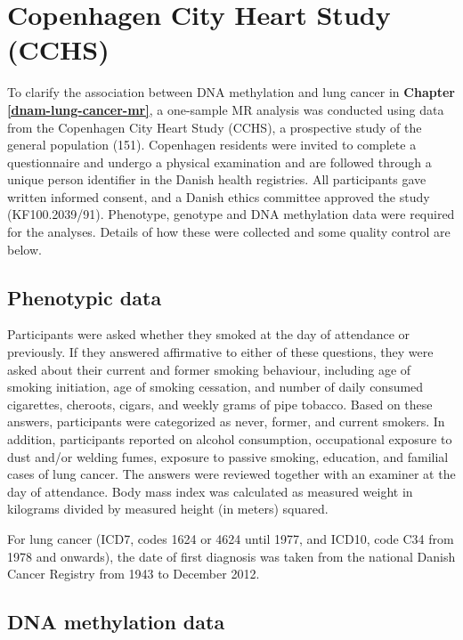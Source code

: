 \documentclass[11pt,twoside]{bristolthesis}
\begin{document}
\hypertarget{cchs-02}{%
\section{Copenhagen City Heart Study (CCHS)}\label{cchs-02}}

To clarify the association between DNA methylation and lung cancer in \textbf{Chapter \ref{dnam-lung-cancer-mr}}, a one-sample MR analysis was conducted using data from the Copenhagen City Heart Study (CCHS), a prospective study of the general population (151). Copenhagen residents were invited to complete a questionnaire and undergo a physical examination and are followed through a unique person identifier in the Danish health registries. All participants gave written informed consent, and a Danish ethics committee approved the study (KF100.2039/91). Phenotype, genotype and DNA methylation data were required for the analyses. Details of how these were collected and some quality control are below.

\hypertarget{cchs-phenotypic-data}{%
\subsection{Phenotypic data}\label{cchs-phenotypic-data}}

Participants were asked whether they smoked at the day of attendance or previously. If they answered affirmative to either of these questions, they were asked about their current and former smoking behaviour, including age of smoking initiation, age of smoking cessation, and number of daily consumed cigarettes, cheroots, cigars, and weekly grams of pipe tobacco. Based on these answers, participants were categorized as never, former, and current smokers. In addition, participants reported on alcohol consumption, occupational exposure to dust and/or welding fumes, exposure to passive smoking, education, and familial cases of lung cancer. The answers were reviewed together with an examiner at the day of attendance. Body mass index was calculated as measured weight in kilograms divided by measured height (in meters) squared.

For lung cancer (ICD7, codes 1624 or 4624 until 1977, and ICD10, code C34 from 1978 and onwards), the date of first diagnosis was taken from the national Danish Cancer Registry from 1943 to December 2012.

\hypertarget{cchs-dnam-data}{%
\subsection{DNA methylation data}\label{cchs-dnam-data}}
\end{document}
